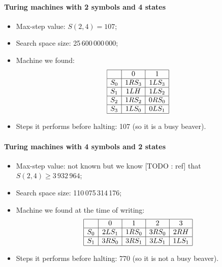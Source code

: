 \documentclass{report}
\begin{document}
\paragraph{Turing machines with 2 symbols and 4 states}


\begin{itemize}
\item Max-step value: $S(2,4) = 107$;
\item Search space size: 25\,600\,000\,000;
\item Machine we found:
\[
\begin{array}[h]{|c|c|c|c|}
  \hline
  &0&   1\\
  \hline
  S_0& 1RS_3& 1LS_3\\
  \hline
  S_1& 1LH& 1LS_2\\
  \hline
  S_2& 1RS_2& 0RS_0\\
  \hline
  S_3& 1LS_0& 0LS_1\\
\hline
\end{array}
\]
\item Steps it performs before halting: 107 (so it is a busy beaver).
\end{itemize}

\paragraph{Turing machines with 4 symbols and 2 states}


\begin{itemize}
\item Max-step value: not known but we know [TODO : ref] that $S(2,4) \geq 3\,932\,964$;
\item Search space size: 110\,075\,314\,176;
\item Machine we found at the time of writing:
\[
\begin{array}[h]{|c|c|c|c|c|}
  \hline
  &  0&   1&   2&   3\\
  \hline
  S_0& 2LS_1& 1RS_0& 3RS_0& 2RH\\
  \hline
  S_1& 3RS_0& 3RS_1& 3LS_1& 1LS_1\\
  \hline
\end{array}
\]
\item Steps it performs before halting: 770 (so it is not a busy beaver).
\end{itemize}

\end{document}
